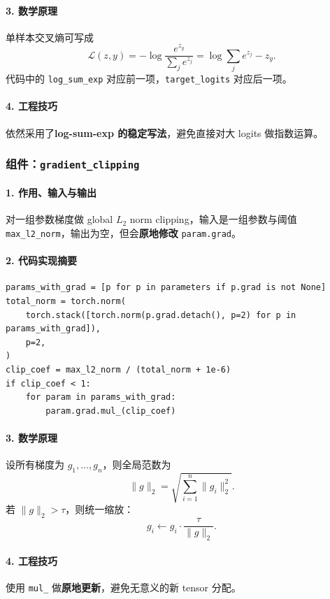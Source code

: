 \documentclass[UTF8,a4paper,11pt]{ctexart}
\begin{document}
\paragraph{3. 数学原理}
单样本交叉熵可写成
\[
\mathcal{L}(z,y) = -\log\frac{e^{z_y}}{\sum_j e^{z_j}}
 = \log\sum_j e^{z_j} - z_y.
\]
代码中的 \texttt{log\_sum\_exp} 对应前一项，\texttt{target\_logits} 对应后一项。

\paragraph{4. 工程技巧}
依然采用了\textbf{log-sum-exp 的稳定写法}，避免直接对大 logits 做指数运算。

\subsubsection{组件：\texttt{gradient\_clipping}}
\paragraph{1. 作用、输入与输出}
对一组参数梯度做 global \(L_2\) norm clipping，输入是一组参数与阈值 \texttt{max\_l2\_norm}，输出为空，但会\textbf{原地修改} \texttt{param.grad}。

\paragraph{2. 代码实现摘要}
\begin{lstlisting}
params_with_grad = [p for p in parameters if p.grad is not None]
total_norm = torch.norm(
    torch.stack([torch.norm(p.grad.detach(), p=2) for p in params_with_grad]),
    p=2,
)
clip_coef = max_l2_norm / (total_norm + 1e-6)
if clip_coef < 1:
    for param in params_with_grad:
        param.grad.mul_(clip_coef)
\end{lstlisting}

\paragraph{3. 数学原理}
设所有梯度为 \(g_1,\dots,g_n\)，则全局范数为
\[
\|g\|_2 = \sqrt{\sum_{i=1}^{n}\|g_i\|_2^2}.
\]
若 \(\|g\|_2 > \tau\)，则统一缩放：
\[
g_i \leftarrow g_i \cdot \frac{\tau}{\|g\|_2}.
\]

\paragraph{4. 工程技巧}
使用 \texttt{mul\_} 做\textbf{原地更新}，避免无意义的新 tensor 分配。
\end{document}
